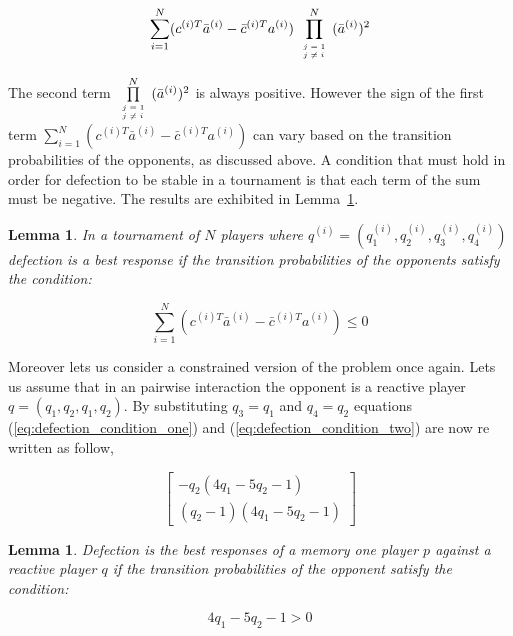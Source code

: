 \documentclass[10pt]{article}
\newtheorem{lemma}[theorem]{Lemma}
\begin{document}
\begin{equation}
\sum_{i=1} ^ N (c^{(i)T} \bar{a}^{(i)} - \bar{c}^{(i)T} a^{(i)})
\prod\limits_{\tiny\begin{array}{l} j=1 \\ j \neq i \end{array}} ^ N (\bar{a}^{(i)})^2
\end{equation}

The second term \(\prod\limits_{\tiny\begin{array}{l} j=1 \\ j \neq i
\end{array}} ^ N (\bar{a}^{(i)})^2\) is always positive. However the sign of the
first term \(\sum_{i=1} ^ N (c^{(i)T} \bar{a}^{(i)} - \bar{c}^{(i)T} a^{(i)})\)
can vary based on the transition probabilities of the opponents, as discussed
above. A condition that must hold in order for defection to be stable in a
tournament is that each term of the sum must be negative. The results are
exhibited in Lemma~\ref{lemma:stability_of_defection}.

\begin{lemma}\label{lemma:stability_of_defection}
    In a tournament of \(N\) players where \(q^{(i)} = (q_{1}^{(i)}, q_{2}^{(i)}, q_{3}^{(i)}, q_{4}^{(i)})\)
    defection is a best response if the transition probabilities of the
    opponents satisfy the condition:

    \begin{equation}
        \sum_{i=1} ^ N (c^{(i)T} \bar{a}^{(i)} - \bar{c}^{(i)T} a^{(i)}) \leq 0
    \end{equation}
\end{lemma}

Moreover lets us consider a constrained version of the problem once again. Lets us
assume that in an pairwise interaction the opponent is a reactive player \(q=(q_1, q_2, q_1, q_2)\).
By substituting \(q_3=q_1\) and \(q_4=q_2\) equations (\ref{eq:defection_condition_one})
and (\ref{eq:defection_condition_two}) are now re written as follow,

\[\left[\begin{matrix}- q_{2} \left(4 q_{1} - 5 q_{2} - 1\right)\\
\left(q_{2} - 1\right) \left(4 q_{1} - 5 q_{2} - 1\right)\end{matrix}\right]\]


\begin{lemma}
Defection is the best responses of a memory one player \(p\) against a reactive
player \(q\) if the transition probabilities of the opponent satisfy the
condition:

\begin{equation}
    4 q_{1} - 5 q_{2} - 1 > 0
\end{equation}
\end{lemma}
\end{document}
